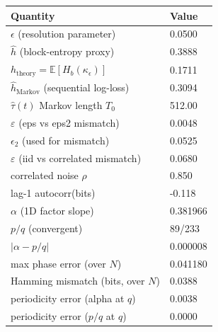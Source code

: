 \begin{center}
\begin{tabular}{ll}
\hline
\textbf{Quantity} & \textbf{Value} \\
\hline
$\epsilon$ (resolution parameter) & 0.0500 \\
$\widehat h$ (block-entropy proxy) & 0.3888 \\
$h_{\mathrm{theory}}=\mathbb{E}[H_b(\kappa_\epsilon)]$ & 0.1711 \\
$\widehat h_{\mathrm{Markov}}$ (sequential log-loss) & 0.3094 \\
$\widehat\tau(t)$ Markov length $T_0$ & 512.00 \\
$\varepsilon$ (eps vs eps2 mismatch) & 0.0048 \\
$\epsilon_2$ (used for mismatch) & 0.0525 \\
$\varepsilon$ (iid vs correlated mismatch) & 0.0680 \\
correlated noise $\rho$ & 0.850 \\
lag-1 autocorr(bits) & -0.118 \\
\hline
$\alpha$ (1D factor slope) & 0.381966 \\
$p/q$ (convergent) & 89/233 \\
$|\alpha-p/q|$ & 0.000008 \\
max phase error (over $N$) & 0.041180 \\
Hamming mismatch (bits, over $N$) & 0.0388 \\
periodicity error (alpha at $q$) & 0.0038 \\
periodicity error ($p/q$ at $q$) & 0.0000 \\
\hline
\end{tabular}
\end{center}
